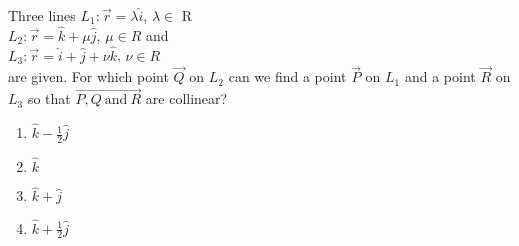 \iffalse
  \title{20. Vector Algebra}
  \author{Niketh Prakash Achanta - EE24BTECH11047}
  \section{mcq-multiple}
\fi
\item %
	Three lines $L_1:\vec{r}=\lambda\hat{i}$, $\lambda\in$ R\\
		$L_2:\vec{r}=\hat{k}+\mu\hat{j}$, $\mu\in R$ and\\
		$L_3:\vec{r}=\hat{i}+\hat{j}+\nu\hat{k}$, $\nu\in R$\\
		are given. For which point $\vec{Q}$ on $L_2$ can we find a point $\vec{P}$ on $L_1$ and a point $\vec{R}$ on $L_3$ so that $\vec{P,Q\ \text{and}\ R}$ are collinear? \hfill{}\\
  \begin{enumerate}
	  \item $\hat{k}-\frac{1}{2}\hat{j}$
	  \item $\hat{k}$
	  \item $\hat{k}+\hat{j}$
	  \item $\hat{k}+\frac{1}{2}\hat{j}$
   \end{enumerate}
